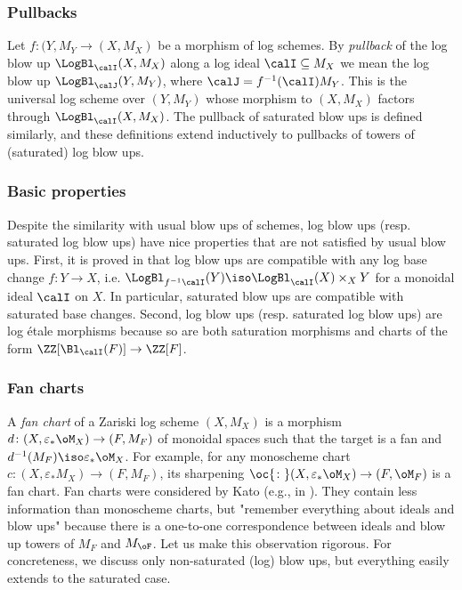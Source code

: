 \documentclass[10pt]{../fichiers-configuration-latex/smfart}
\begin{document}
\subsubsection{Pullbacks}\label{8-logpullsec} Let
$f{\colon}(Y,M_Y\to(X,M_X)$ be a morphism of log schemes. By
{\em pullback} of the log blow up $\LogBl_\calI(X,M_X)$
along a log ideal $\calI\subseteq M_X$ we mean the log blow up
$\LogBl_{\calJ}(Y,M_Y)$, where $\calJ=f^{-1}(\calI)M_Y$. This is
the universal log scheme over $(Y,M_Y)$ whose morphism to $(X,M_X)$
factors through $\LogBl_\calI(X,M_X)$. The pullback of saturated blow
ups is defined similarly, and these definitions extend inductively
to pullbacks of towers of (saturated) log blow ups.

\subsubsection{Basic properties}\label{8-basiclogblowsec}
Despite the similarity with usual blow ups of schemes,
log blow ups (resp. saturated log blow ups) have nice
properties that are not satisfied by usual blow ups. First,
it is proved in \cite[4.8]{Toric@Niziol} that log blow ups
are compatible with any log base change $f{\colon}Y\to X$,
i.e. $\LogBl_{f^{-1}\calI}(Y)\iso\LogBl_\calI(X)\times_XY$
for a monoidal ideal $\calI$ on $X$. In particular, saturated
blow ups are compatible with saturated base changes. Second, log
blow ups (resp. saturated log blow ups) are log \'etale morphisms
because so are both saturation morphisms and charts of the form
$\ZZ[\Bl_\calI(F)]\to\ZZ[F]$.

\subsubsection{Fan charts}\label{8-fanchart} A {\em
fan chart} of a Zariski log scheme $(X,M_X)$ is a
morphism $d{\colon}(X,\varepsilon_*\oM_X)\to(F,M_F)$
of monoidal spaces such that the target is a fan and
$d^{-1}(M_F)\iso\varepsilon_*\oM_X$. For example, for any
monoscheme chart $c{\colon}(X,\varepsilon_*M_X)\to(F,M_F)$,
its sharpening $\oc{\colon}(X,\varepsilon_*\oM_X)\to(F,\oM_F)$
is a fan chart. Fan charts were considered by Kato (e.g.,
in \cite[9.9]{Toric@Kato}). They contain less information than
monoscheme charts, but "remember everything about ideals and blow
ups" because there is a one-to-one correspondence between ideals and
blow up towers of $M_F$ and $M_\oF$. Let us make this observation
rigorous. For concreteness, we discuss only non-saturated (log)
blow ups, but everything easily extends to the saturated case.
\end{document}
